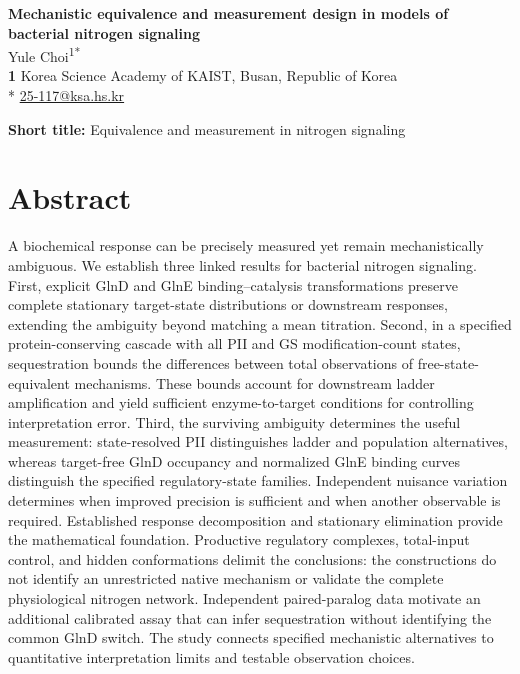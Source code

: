 \documentclass[10pt,letterpaper]{article}
\begin{document}
\vspace*{0.2in}
\begin{flushleft}
{\Large\textbf{Mechanistic equivalence and measurement design in models of bacterial nitrogen signaling}}
\\
Yule Choi\textsuperscript{1*}
\\
\bigskip
\textbf{1} Korea Science Academy of KAIST, Busan, Republic of Korea
\\
\bigskip
* \href{mailto:25-117@ksa.hs.kr}{25-117@ksa.hs.kr}
\end{flushleft}
\noindent\textbf{Short title:} Equivalence and measurement in nitrogen signaling

\section*{Abstract}

A biochemical response can be precisely measured yet remain mechanistically ambiguous. We establish three linked results for bacterial nitrogen signaling. First, explicit GlnD and GlnE binding--catalysis transformations preserve complete stationary target-state distributions or downstream responses, extending the ambiguity beyond matching a mean titration. Second, in a specified protein-conserving cascade with all PII and GS modification-count states, sequestration bounds the differences between total observations of free-state-equivalent mechanisms. These bounds account for downstream ladder amplification and yield sufficient enzyme-to-target conditions for controlling interpretation error. Third, the surviving ambiguity determines the useful measurement: state-resolved PII distinguishes ladder and population alternatives, whereas target-free GlnD occupancy and normalized GlnE binding curves distinguish the specified regulatory-state families. Independent nuisance variation determines when improved precision is sufficient and when another observable is required. Established response decomposition and stationary elimination provide the mathematical foundation. Productive regulatory complexes, total-input control, and hidden conformations delimit the conclusions: the constructions do not identify an unrestricted native mechanism or validate the complete physiological nitrogen network. Independent paired-paralog data motivate an additional calibrated assay that can infer sequestration without identifying the common GlnD switch. The study connects specified mechanistic alternatives to quantitative interpretation limits and testable observation choices.
\end{document}
